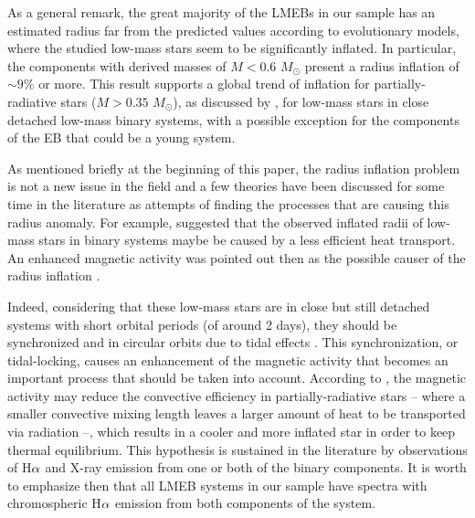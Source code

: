 \documentclass[fleqn,usenatbib]{mnras}
\begin{document}
As a general remark, the great majority of the LMEBs in our sample has an estimated radius far from the predicted values according to evolutionary models, where the studied low-mass stars seem to be significantly inflated. In particular, the components with derived masses of $M < 0.6$ $M_{\odot}$ present a radius inflation of $\sim$$9\%$ or more. This result supports a global trend of inflation for partially-radiative stars ($M > 0.35$ $M_{\odot}$), as discussed by \citet{Knigge11}, for low-mass stars in close detached low-mass binary systems, with a possible exception for the components of the EB that could be a young system.


As mentioned briefly at the beginning of this paper, the radius inflation problem is not a new issue in the field and a few theories have been discussed for some time in the literature as attempts of finding the processes that are causing this radius anomaly. For example, \citet{Chabrier07} suggested that the observed inflated radii of low-mass stars in binary systems maybe be caused by a less efficient heat transport. An enhanced magnetic activity was pointed out then as the possible causer of the radius inflation \citep{Torres06,Chabrier07}.

Indeed, considering that these low-mass stars are in close but still detached systems with short orbital periods (of around 2 days), they should be synchronized and in circular orbits due to tidal effects \citep{Zahn77}. This synchronization, or tidal-locking, causes an enhancement of the magnetic activity that becomes an important process that should be taken into account. 
According to \citet{Chabrier07}, the magnetic activity may reduce the convective efficiency in partially-radiative stars -- where a smaller convective mixing length leaves a larger amount of heat to be transported via radiation --, which results in a cooler and more inflated star in order to keep thermal equilibrium. This hypothesis is sustained in the literature by observations of H${\rm \alpha}$ and X-ray emission from one or both of the binary components. It is worth to emphasize then that all LMEB systems in our sample have spectra with chromospheric H${\rm \alpha}$ emission from both components of the system.
\end{document}
